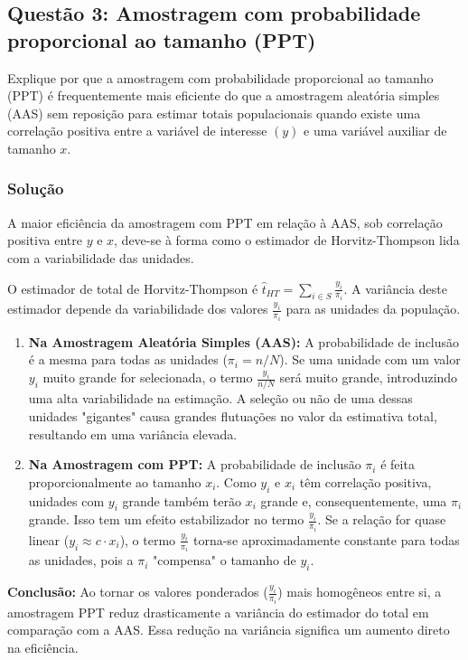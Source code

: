 \documentclass{article}
\begin{document}
\hrulefill
\subsection*{Questão 3: Amostragem com probabilidade proporcional ao tamanho (PPT)}
Explique por que a amostragem com probabilidade proporcional ao tamanho (PPT) é frequentemente mais eficiente do que a amostragem aleatória simples (AAS) sem reposição para estimar totais populacionais quando existe uma correlação positiva entre a variável de interesse $(y)$ e uma variável auxiliar de tamanho $x$.

\subsubsection*{Solução}
A maior eficiência da amostragem com PPT em relação à AAS, sob correlação positiva entre $y$ e $x$, deve-se à forma como o estimador de Horvitz-Thompson lida com a variabilidade das unidades.

O estimador de total de Horvitz-Thompson é $\hat{t}_{HT} = \sum_{i \in S} \frac{y_i}{\pi_i}$. A variância deste estimador depende da variabilidade dos valores $\frac{y_i}{\pi_i}$ para as unidades da população.

\begin{enumerate}
    \item \textbf{Na Amostragem Aleatória Simples (AAS):} A probabilidade de inclusão é a mesma para todas as unidades ($\pi_i = n/N$). Se uma unidade com um valor $y_i$ muito grande for selecionada, o termo $\frac{y_i}{n/N}$ será muito grande, introduzindo uma alta variabilidade na estimação. A seleção ou não de uma dessas unidades "gigantes" causa grandes flutuações no valor da estimativa total, resultando em uma variância elevada.

    \item \textbf{Na Amostragem com PPT:} A probabilidade de inclusão $\pi_i$ é feita proporcionalmente ao tamanho $x_i$. Como $y_i$ e $x_i$ têm correlação positiva, unidades com $y_i$ grande também terão $x_i$ grande e, consequentemente, uma $\pi_i$ grande. Isso tem um efeito estabilizador no termo $\frac{y_i}{\pi_i}$. Se a relação for quase linear ($y_i \approx c \cdot x_i$), o termo $\frac{y_i}{\pi_i}$ torna-se aproximadamente constante para todas as unidades, pois a $\pi_i$ "compensa" o tamanho de $y_i$.
\end{enumerate}

\textbf{Conclusão:} Ao tornar os valores ponderados ($\frac{y_i}{\pi_i}$) mais homogêneos entre si, a amostragem PPT reduz drasticamente a variância do estimador do total em comparação com a AAS. Essa redução na variância significa um aumento direto na eficiência.
\end{document}
